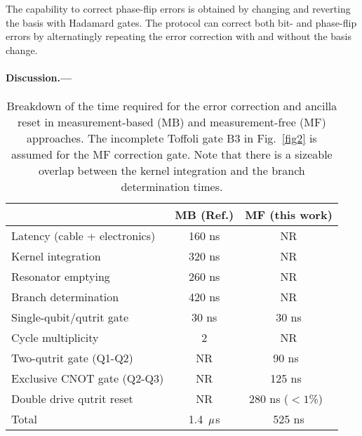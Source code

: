 \documentclass[aps,prl,twocolumn,groupedaddress,superscriptaddress]{revtex4}
\begin{document}
The capability to correct phase-flip errors is obtained by changing and reverting the basis with Hadamard gates.
The protocol can correct both bit- and phase-flip errors by alternatingly repeating the error correction with and without the basis change.

\paragraph{Discussion.---}

\begin{table}[!t]
\caption{
Breakdown of the time required for the error correction and ancilla reset in measurement-based (MB) and measurement-free (MF) approaches.
The incomplete Toffoli gate B3 in Fig.~\ref{fig2} is assumed for the MF correction gate.
Note that there is a sizeable overlap between the kernel integration and the branch determination times.
}
\label{tab1}
\begin{ruledtabular}
\small
\begin{tabular}{lcc}
& MB (Ref.) &  MF (this work)     \\ \hline
Latency (cable + electronics) & 160 ns & NR \\
Kernel integration & 320 ns & NR \\
Resonator emptying & 260 ns & NR \\
Branch determination & 420 ns & NR \\
Single-qubit/qutrit gate & 30 ns & 30 ns \\
Cycle multiplicity & 2 & NR \\
Two-qutrit gate (Q1-Q2) & NR & 90 ns~\cite{wei2021} \\
Exclusive CNOT gate (Q2-Q3) & NR & 125 ns~\cite{blok2021} \\
Double drive qutrit reset & NR & 280 ns ($<1$\%)~\cite{magnard2018} \\ \hline
Total & 1.4~${\rm \mu}$s & 525 ns \\
\end{tabular}
\end{ruledtabular}
\end{table}
\end{document}

